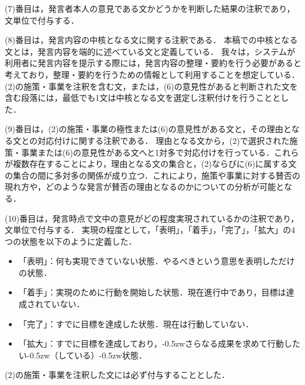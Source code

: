 \documentclass[japanese]{jnlp_1.4}
\begin{document}
(7)番目は，発言者本人の意見である文かどうかを判断した結果の注釈であり，文単位で付与する．

(8)番目は，発言内容の中核となる文に関する注釈である．
本稿での中核となる文とは，発言内容を端的に述べている文と定義している．
我々は，システムが利用者に発言内容を提示する際には，発言内容の整理・要約を行う必要があると考えており，整理・要約を行うための情報として利用することを想定している．
(2)の施策・事業を注釈を含む文，または，(6)の意見性があると判断された文を含む段落には，最低でも1文は中核となる文を選定し注釈付けを行うこととした．

(9)番目は，(2)の施策・事業の極性または(6)の意見性がある文と，その理由となる文との対応付けに関する注釈である．
理由となる文から，(2)で選択された施策・事業または(6)の意見性がある文へと1対多で対応付けを行っている．これらが複数存在することにより，理由となる文の集合と，(2)ならびに(6)に属する文の集合の間に多対多の関係が成り立つ．これにより，施策や事業に対する賛否の現れ方や，どのような発言が賛否の理由となるのかについての分析が可能となる．

(10)番目は，発言時点で文中の意見がどの程度実現されているかの注釈であり，文単位で付与する．
実現の程度として，「表明」，「着手」，「完了」，「拡大」の4つの状態を以下のように定義した．
\begin{itemize}
\item 「表明」：何も実現できていない状態．やるべきという意思を表明しただけの状態．
\item 「着手」：実現のために行動を開始した状態．現在進行中であり，目標は達成されていない．
\item 「完了」：すでに目標を達成した状態．現在は行動していない．
\item 「拡大」：すでに目標を達成しており，{\kern-0.5zw}さらなる成果を求めて行動したい{\kern-0.5zw}（している）{\kern-0.5zw}状態．
\end{itemize}
(2)の施策・事業を注釈した文には必ず付与することとした．
\end{document}
